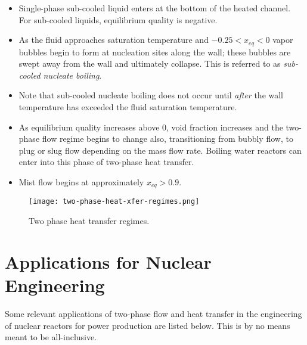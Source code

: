 \begin{itemize}
\item Single-phase sub-cooled liquid enters at the bottom of the heated channel.  For sub-cooled liquids, equilibrium quality is negative.  

\item As the fluid approaches saturation temperature and $-0.25 < x_{eq} < 0$ vapor bubbles begin to form at nucleation sites along the wall; these bubbles are swept away from the wall and ultimately collapse.  This is referred to as \emph{sub-cooled nucleate boiling}.

\item Note that sub-cooled nucleate boiling does not occur until \emph{after} the wall temperature has exceeded the fluid saturation temperature.  

\item As equilibrium quality increases above 0, void fraction increases and the two-phase flow regime begins to change also, transitioning from bubbly flow, to plug or slug flow depending on the mass flow rate.  Boiling water reactors can enter into this phase of two-phase heat transfer.

\item Mist flow begins at approximately $x_{eq} > 0.9$.

\end{itemize}

\begin{figure}
\texttt{[image: two-phase-heat-xfer-regimes.png]}
\caption{Two phase heat transfer regimes.}
\label{fig:two-phase-heat-xfer-regimes}
\end{figure}

\section{Applications for Nuclear Engineering}
Some relevant applications of two-phase flow and heat transfer in the engineering of nuclear reactors for power production are listed below.  This is by no means meant to be all-inclusive.

